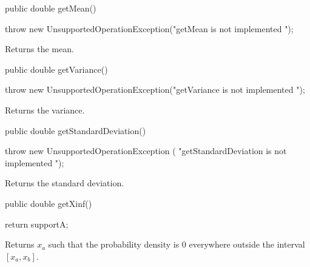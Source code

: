 \begin{htmlonly}
\end{htmlonly}
\begin{code}

   public double getMean()\begin{hide} {
      throw new UnsupportedOperationException("getMean is not implemented ");
   }\end{hide}
\end{code}
\begin{tabb} Returns the mean.
\end{tabb}
\begin{htmlonly}
\end{htmlonly}
\begin{code}

   public double getVariance()\begin{hide} {
      throw new UnsupportedOperationException("getVariance is not implemented ");
   }\end{hide}
\end{code}
\begin{tabb} Returns the variance.
\end{tabb}
\begin{htmlonly}
\end{htmlonly}
\begin{code}

   public double getStandardDeviation()\begin{hide} {
      throw new UnsupportedOperationException (
         "getStandardDeviation is not implemented ");
   }
\end{hide}
\end{code}
\begin{tabb} Returns the standard deviation.
\end{tabb}
\begin{htmlonly}
\end{htmlonly}
\begin{code}

   public double getXinf()\begin{hide} {
      return supportA;
   }\end{hide}
\end{code}
\begin{tabb} Returns $x_a$ such that the probability density is 0 everywhere
 outside the interval $[x_a, x_b]$.
\end{tabb}
